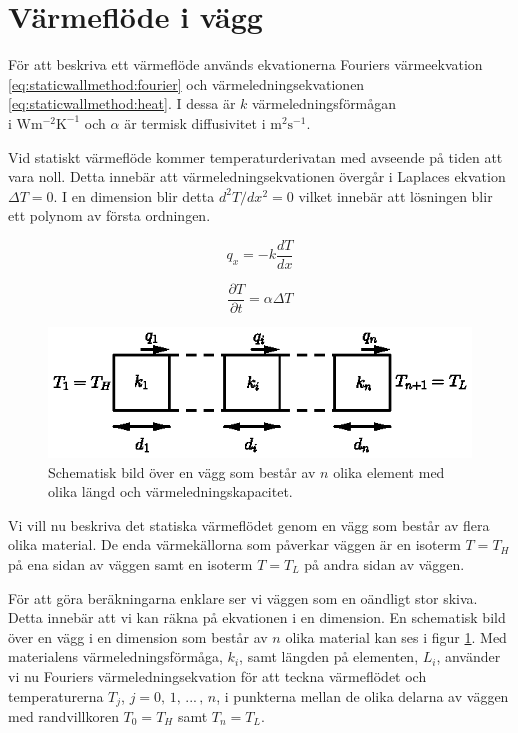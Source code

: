 \section{Värmeflöde i vägg}

För att beskriva ett värmeflöde används ekvationerna Fouriers värmeekvation
\eqref{eq:staticwallmethod:fourier} och värmeledningsekvationen 
\eqref{eq:staticwallmethod:heat}. 
I dessa är
$k$ värmeledningsförmågan\\i $\mbox{W}\mbox{m}^{-2}\mbox{K}^{-1}$ och
$\alpha$ är termisk diffusivitet i $\mbox{m}^2\mbox{s}^{-1}$. \cite{physicshandbook}

Vid statiskt värmeflöde kommer temperaturderivatan med avseende på tiden att vara noll.
Detta innebär att värmeledningsekvationen övergår i Laplaces ekvation
$\Delta{}T = 0$. I en dimension blir detta $d^2T/dx^2 = 0$ vilket innebär
att lösningen blir ett polynom av första ordningen.  

\begin{equation}
\label{eq:staticwallmethod:fourier}
q_x = -k\frac{dT}{dx}
\end{equation}

\begin{equation}
\label{eq:staticwallmethod:heat}
\frac{\partial{}T}{\partial{}t} = \alpha\Delta{}T
\end{equation}

\begin{figure}
\centering
\includegraphics{images/wall.eps}
\caption{Schematisk bild över en vägg som består av $n$ olika element med olika
längd och värmeledningskapacitet.}\label{fig:staticwallmethod:wall}
\end{figure}

\noindent
Vi vill nu beskriva det statiska värmeflödet genom en vägg som består
av flera olika material. De enda värmekällorna som påverkar väggen
är en isoterm $T = T_H$ på ena sidan av väggen
samt en isoterm $T = T_L$ på andra sidan av väggen.

För att göra beräkningarna enklare
ser vi väggen som en oändligt stor skiva. Detta innebär att vi kan räkna
på ekvationen i en dimension. 
En schematisk bild över en vägg i en dimension som består av
$n$ olika material kan ses i figur \ref{fig:staticwallmethod:wall}.
Med materialens värmeledningsförmåga, $k_i$, samt längden
på elementen, $L_i$, använder vi nu Fouriers värmeledningsekvation för
att teckna värmeflödet och temperaturerna $T_j$,  $j=0,\,1,\,...\,,\,n$, i punkterna
mellan de olika delarna av väggen med randvillkoren $T_0 = T_H$ samt
$T_n = T_L$.

